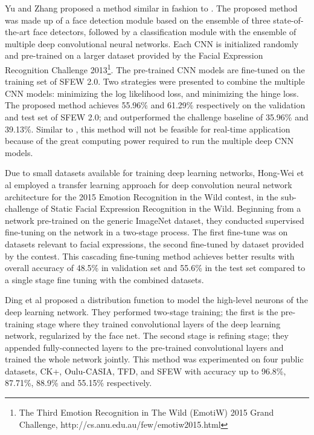 \documentclass[master]{thesis-uestc}
\begin{document}
Yu and Zhang\cite{Yu:2015:IBS:2818346.2830595} proposed a method similar in fashion to \cite{7410698}. The proposed method was made up of a face detection module based on the ensemble of three state-of-the-art face detectors, followed by a classification module with the ensemble of multiple deep convolutional neural networks. Each CNN is initialized randomly and pre-trained on a larger dataset provided by the Facial Expression Recognition Challenge 2013\footnote{The Third Emotion Recognition in The Wild (EmotiW) 2015 Grand Challenge, http://cs.anu.edu.au/few/emotiw2015.html}. The pre-trained CNN models are fine-tuned on the training set of SFEW 2.0. Two strategies were presented to combine the multiple CNN models: minimizing the log likelihood loss, and minimizing the hinge loss. The proposed method achieves 55.96\% and 61.29\% respectively on the validation and test set of SFEW 2.0; and outperformed the challenge baseline of 35.96\% and 39.13\%. Similar to \cite{7410698}, this method will not be feasible for real-time application because of the great computing power required to run the multiple deep CNN models.

Due to small datasets available for training deep learning networks, Hong-Wei et al\cite{Ng:2015:DLE:2818346.2830593} employed a transfer learning approach for deep convolution neural network architecture for the 2015 Emotion Recognition in the Wild contest, in the sub-challenge of Static Facial Expression Recognition in the Wild. Beginning from a network pre-trained on the generic ImageNet dataset, they conducted supervised fine-tuning on the network in a two-stage process. The first fine-tune was on datasets relevant to facial expressions, the second fine-tuned by dataset provided by the contest. This cascading fine-tuning method achieves better results with overall accuracy of 48.5\% in validation set and 55.6\% in the test set compared to a single stage fine tuning with the combined datasets.

Ding et al\cite{7961731} proposed a distribution function to model the high-level neurons of the deep learning network. They performed two-stage training; the first is the pre-training stage where they trained convolutional layers of the deep learning network, regularized by the face net. The second stage is refining stage; they appended fully-connected layers to the pre-trained convolutional layers and trained the whole network jointly. This method was experimented on four public datasets, CK+, Oulu-CASIA, TFD, and SFEW with accuracy up to 96.8\%, 87.71\%, 88.9\% and 55.15\% respectively.
\end{document}
